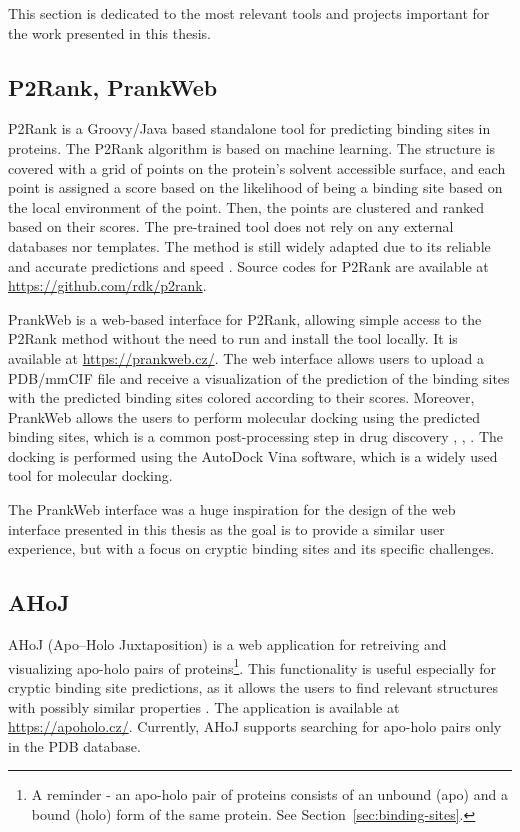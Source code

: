 This section is dedicated to the most relevant tools and projects important for the work presented in this thesis.

\subsection{P2Rank, PrankWeb}
\label{sec:prankweb-p2rank}

P2Rank is a Groovy/Java based standalone tool for predicting binding sites in proteins. The P2Rank algorithm is based on machine learning. The structure is covered with a grid of points on the protein's solvent accessible surface, and each point is assigned a score based on the likelihood of being a binding site based on the local environment of the point. Then, the points are clustered and ranked based on their scores. The pre-trained tool does not rely on any external databases nor templates. The method is still widely adapted due to its reliable and accurate predictions and speed \cite{krivak2018p2rank}. Source codes for P2Rank are available at \url{https://github.com/rdk/p2rank}.

PrankWeb is a web-based interface for P2Rank, allowing simple access to the P2Rank method without the need to run and install the tool locally. It is available at \url{https://prankweb.cz/}. The web interface allows users to upload a PDB/mmCIF file and receive a visualization of the prediction of the binding sites with the predicted binding sites colored according to their scores. Moreover, PrankWeb allows the users to perform molecular docking using the predicted binding sites, which is a common post-processing step in drug discovery \cite{polak2025prankweb}, \cite{jakubec2022prankweb}, \cite{jendele2019prankweb}. The docking is performed using the AutoDock Vina \cite{trott2010autodock} software, which is a widely used tool for molecular docking.

The PrankWeb interface was a huge inspiration for the design of the web interface presented in this thesis as the goal is to provide a similar user experience, but with a focus on cryptic binding sites and its specific challenges.

\subsection{AHoJ}
\label{sec:ahoj}

AHoJ (Apo–Holo Juxtaposition) is a web application for retreiving and visualizing apo-holo pairs of proteins\footnote{A reminder - an apo-holo pair of proteins consists of an unbound (apo) and a bound (holo) form of the same protein. See Section~\ref{sec:binding-sites}.}. This functionality is useful especially for cryptic binding site predictions, as it allows the users to find relevant structures with possibly similar properties \cite{feidakis2022ahoj}. The application is available at \url{https://apoholo.cz/}. Currently, AHoJ supports searching for apo-holo pairs only in the PDB database.

